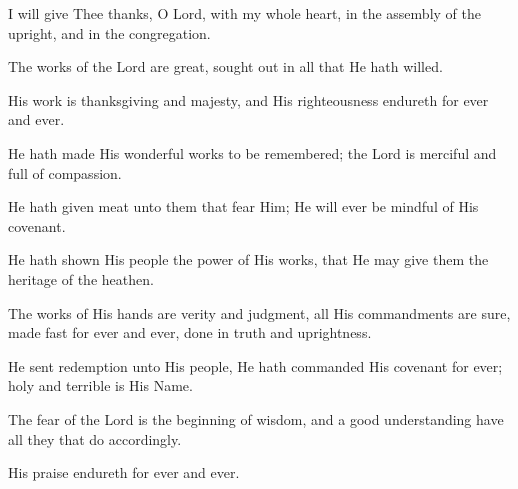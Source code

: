 I will give Thee thanks, O Lord, with my whole heart, in the assembly of the upright, and in the congregation.

The works of the Lord are great, sought out in all that He hath willed.

His work is thanksgiving and majesty, and His righteousness endureth for ever and ever.

He hath made His wonderful works to be remembered; the Lord is merciful and full of compassion.

He hath given meat unto them that fear Him; He will ever be mindful of His covenant.

He hath shown His people the power of His works, that He may give them the heritage of the heathen.

The works of His hands are verity and judgment, all His commandments are sure, made fast for ever and ever, done in truth and uprightness.

He sent redemption unto His people, He hath commanded His covenant for ever; holy and terrible is His Name.

The fear of the Lord is the beginning of wisdom, and a good understanding have all they that do accordingly.

His praise endureth for ever and ever.
